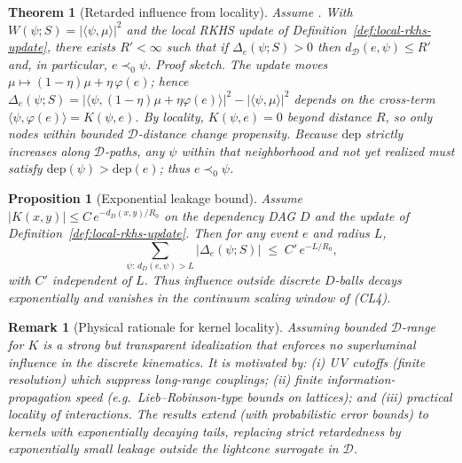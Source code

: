 \documentclass[12pt,a4paper]{article}
\newtheorem{proposition}{Proposition}
\newtheorem{theorem}{Theorem}
\newtheorem{remark}{Remark}
\begin{document}
\begin{theorem}[Retarded influence from locality]\label{thm:retarded}
Assume . 
With $W(\psi;S)=|\langle \psi,\mu\rangle|^2$ and the local RKHS update of Definition~\ref{def:local-rkhs-update}, there exists $R'<\infty$ such that if $\Delta_e(\psi;S)>0$ then $d_\mathcal{D}(e,\psi)\le R'$ and, in particular, $e\prec_0 \psi$.
\emph{Proof sketch.} The update moves $\mu\mapsto(1-\eta)\mu+\eta\,\varphi(e)$; hence
$\Delta_e(\psi;S)=|\langle \psi,(1-\eta)\mu+\eta\varphi(e)\rangle|^2-|\langle \psi,\mu\rangle|^2$
depends on the cross-term $\langle \psi,\varphi(e)\rangle=K(\psi,e)$. By locality, $K(\psi,e)=0$ beyond distance $R$, so only nodes within bounded $\mathcal{D}$-distance change propensity.
Because $\mathrm{dep}$ strictly increases along $\mathcal{D}$-paths, any $\psi$ within that neighborhood and not yet realized must satisfy $\mathrm{dep}(\psi)>\mathrm{dep}(e)$; thus $e\prec_0 \psi$.
\qedhere
\end{theorem}

\begin{proposition}[Exponential leakage bound]\label{prop:leakage}
Assume \(|K(x,y)|\le C\,e^{-d_D(x,y)/R_0}\) on the dependency DAG \(D\) and
the update of Definition~\ref{def:local-rkhs-update}. Then for any event \(e\) and radius \(L\),
\[
\sum_{\psi:\, d_D(e,\psi)>L}\big|\Delta_e(\psi;S)\big|\;\le\; C'\,e^{-L/R_0},
\]
with \(C'\) independent of \(L\). Thus influence outside discrete \(D\)-balls decays exponentially
and vanishes in the continuum scaling window of (CL4).
\end{proposition}

\begin{remark}[Physical rationale for kernel locality]\label{rem:locality_physics}
Assuming bounded $\mathcal{D}$-range for $K$ is a strong but transparent idealization that enforces no superluminal influence in the discrete kinematics. It is motivated by: (i) UV cutoffs (finite resolution) which suppress long-range couplings; (ii) finite information-propagation speed (e.g.\ Lieb--Robinson-type bounds on lattices); and (iii) practical locality of interactions. The results extend (with probabilistic error bounds) to kernels with \emph{exponentially decaying} tails, replacing strict retardedness by exponentially small leakage outside the lightcone surrogate in $\mathcal{D}$.
\end{remark}
\end{document}
